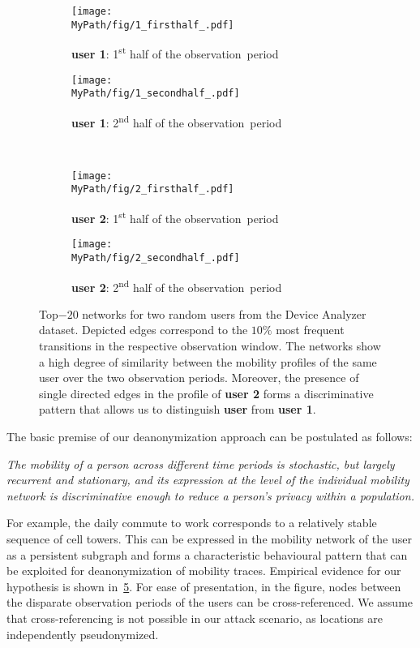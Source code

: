 \begin{figure}[!t]
	\centering
	\begin{subfigure}[]{0.495\textwidth}
		\centering		\texttt{[image: \\MyPath/fig/1\_firsthalf\_.pdf]}
		\caption{{\textbf{user 1}: 1\textsuperscript{st} half of the \mbox{observation period}}}
		\label{fig:evidence11}
	\end{subfigure}%
	\begin{subfigure}[]{0.495\textwidth}
		\centering
		\texttt{[image: \\MyPath/fig/1\_secondhalf\_.pdf]}
		\caption{{\textbf{user 1}: 2\textsuperscript{nd} half of the \mbox{observation period}}}
		\label{fig:evidence12}
	\end{subfigure}%
	\\
	\begin{subfigure}[]{0.495\textwidth}
		\centering
		\texttt{[image: \\MyPath/fig/2\_firsthalf\_.pdf]}
		\caption{{\textbf{user 2}: 1\textsuperscript{st} half of the \mbox{observation period}}}
		\label{fig:evidence21}
	\end{subfigure}
	\begin{subfigure}[]{0.495\textwidth}
		\centering
		\texttt{[image: \\MyPath/fig/2\_secondhalf\_.pdf]}
		\caption{{\textbf{user 2}: 2\textsuperscript{nd} half of the \mbox{observation period}}}
		\label{fig:evidence22}
	\end{subfigure}
	\caption{{Top$-20$ networks for two random users from the Device Analyzer dataset.
			Depicted edges correspond to the $10\%$ most frequent transitions in the respective observation window.
			The networks show a high degree of similarity between the mobility profiles of the same user over the two observation periods.
			Moreover, the presence of single directed edges in the profile of \textbf{user 2} forms a discriminative pattern that allows us to distinguish \textbf{user} from \textbf{user 1}.}}
	\label{fig:evidence}
\end{figure}

The basic premise of our deanonymization approach can be postulated as follows:

\emph{
	The mobility of a person across different time periods is stochastic, but largely recurrent and stationary, and its expression at the level of the individual mobility network is discriminative enough to reduce a person's privacy within a population.}

For example, the daily commute to work corresponds to a relatively stable sequence of cell towers.
This can be expressed in the mobility network of the user as a persistent subgraph and forms a characteristic behavioural pattern that can be exploited for deanonymization of mobility traces.
Empirical evidence for our hypothesis is shown in~\cref{fig:evidence}.
For ease of presentation, in the figure, nodes between the disparate observation periods of the users can be cross-referenced. We assume that cross-referencing is not possible in our attack scenario, as locations are independently pseudonymized.


